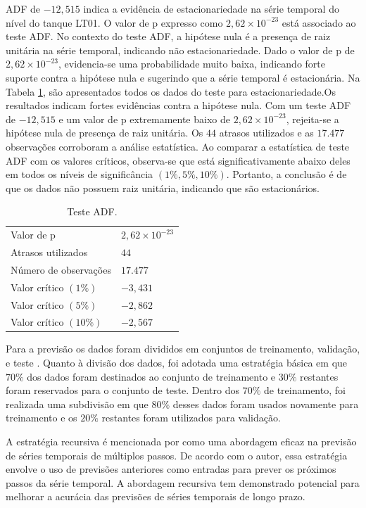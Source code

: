 ADF de $-12,515$ indica a evidência de estacionariedade na série temporal do nível do tanque LT01. 
O valor de p expresso como $2,62\times 10^{-23}$ está associado ao teste ADF. No contexto do teste ADF, a hipótese nula é a presença de raiz unitária na série temporal, indicando não estacionariedade. Dado o valor de p de $2,62\times 10^{-23}$, evidencia-se uma probabilidade muito baixa, indicando forte suporte contra a hipótese nula e sugerindo que a série temporal é estacionária. Na Tabela \ref{tb:adf}, são apresentados todos os dados do teste para estacionariedade.Os resultados indicam fortes evidências contra a hipótese nula. Com um teste ADF de $-12,515 $ e um valor de p extremamente baixo de $2,62 \times 10^{-23}$, rejeita-se a hipótese nula de presença de raiz unitária. Os $44$ atrasos utilizados e as $17.477$ observações corroboram a análise estatística. Ao comparar a estatística de teste ADF com os valores críticos, observa-se que está significativamente abaixo deles em todos os níveis de significância $(1\%, 5\%, 10\%)$. Portanto, a conclusão é de que os dados não possuem raiz unitária, indicando que são estacionários.

\begin{table}[!htb]
	\centering
	\caption{Teste ADF.}\label{tb:adf}
	\begin{tabular}{ll}
		\hline
		Valor de p & $2,62 \times 10^{-23}$ \\
		Atrasos utilizados & $44$ \\
		Número de observações & $17.477$ \\
		Valor crítico $(1\%)$ & $-3,431$ \\
		Valor crítico $(5\%)$ & $-2,862$ \\
		Valor crítico $(10\%)$ & $-2,567$ \\
		\hline
	\end{tabular}
\end{table}

Para a previsão os dados foram divididos em conjuntos de treinamento, validação, e teste \cite{raschka2015practical, geron2017hands_on}. Quanto à divisão dos dados, foi adotada uma estratégia básica em que $70\%$ dos dados foram destinados ao conjunto de treinamento e $30\%$ restantes foram reservados para o conjunto de teste. Dentro dos $70\%$ de treinamento, foi realizada uma subdivisão em que $80\%$ desses dados foram usados novamente para treinamento e os $20\%$ restantes foram utilizados para validação. 

A estratégia recursiva é mencionada por  como uma abordagem eficaz na previsão de séries temporais de múltiplos passos. De acordo com o autor, essa estratégia envolve o uso de previsões anteriores como entradas para prever os próximos passos da série temporal. A abordagem recursiva tem demonstrado potencial para melhorar a acurácia das previsões de séries temporais de longo prazo.


